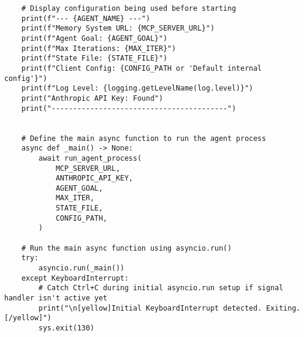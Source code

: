 \documentclass[12pt,a4paper]{article}
\begin{document}
\begin{pageablecode}
\begin{verbatim}
    # Display configuration being used before starting
    print(f"--- {AGENT_NAME} ---")
    print(f"Memory System URL: {MCP_SERVER_URL}")
    print(f"Agent Goal: {AGENT_GOAL}")
    print(f"Max Iterations: {MAX_ITER}")
    print(f"State File: {STATE_FILE}")
    print(f"Client Config: {CONFIG_PATH or 'Default internal config'}")
    print(f"Log Level: {logging.getLevelName(log.level)}")
    print("Anthropic API Key: Found")
    print("-----------------------------------------")


    # Define the main async function to run the agent process
    async def _main() -> None:
        await run_agent_process(
            MCP_SERVER_URL,
            ANTHROPIC_API_KEY,
            AGENT_GOAL,
            MAX_ITER,
            STATE_FILE,
            CONFIG_PATH,
        )

    # Run the main async function using asyncio.run()
    try:
        asyncio.run(_main())
    except KeyboardInterrupt:
        # Catch Ctrl+C during initial asyncio.run setup if signal handler isn't active yet
        print("\n[yellow]Initial KeyboardInterrupt detected. Exiting.[/yellow]")
        sys.exit(130)
\end{verbatim}
\end{pageablecode}

\end{document}
